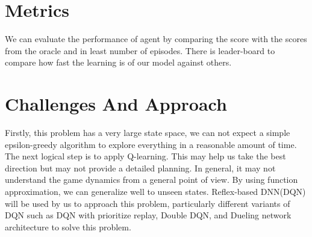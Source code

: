 \documentclass[12pt]{article}
\begin{document}
\section{Metrics}
We can evaluate the performance of agent by comparing the score with the scores from the oracle and in least number of episodes. There is leader-board to compare how fast the learning is of our model against others. \citep{leaderboard}

\section{Challenges And Approach}

Firstly, this problem has a very large state space, we can not expect a simple epsilon-greedy algorithm to explore everything in a reasonable amount of time. The next logical step is to apply Q-learning. This may help us take the best direction but may not provide a detailed planning. In general, it may not understand the game dynamics from a general point of view. By using function approximation, we can generalize well to unseen states. Reflex-based DNN(DQN) will be used by us to approach this problem, particularly different variants of DQN such as DQN with prioritize replay\citep{PrioritizedReplay}, Double DQN\citep{DoubleQ-learning}, and Dueling network architecture \citep{Dueling} to solve this problem.



\end{document}

